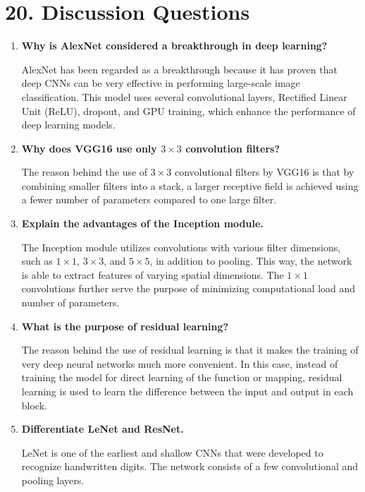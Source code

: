 \documentclass[11pt]{article}
\begin{document}
\section*{20. Discussion Questions}

\begin{enumerate}

\item \textbf{Why is AlexNet considered a breakthrough in deep learning?}

AlexNet has been regarded as a breakthrough because it has proven that deep CNNs can be very effective in performing large-scale image classification. This model uses several convolutional layers, Rectified Linear Unit (ReLU), dropout, and GPU training, which enhance the performance of deep learning models.

\item \textbf{Why does VGG16 use only $3\times3$ convolution filters?}

The reason behind the use of $3 \times 3$ convolutional filters by VGG16 is that by combining smaller filters into a stack, a larger receptive field is achieved using a fewer number of parameters compared to one large filter.

\item \textbf{Explain the advantages of the Inception module.}

The Inception module utilizes convolutions with various filter dimensions, such as $1\times1$, $3\times3$, and $5\times5$, in addition to pooling. This way, the network is able to extract features of varying spatial dimensions. The $1\times1$ convolutions further serve the purpose of minimizing computational load and number of parameters.

\item \textbf{What is the purpose of residual learning?}

The reason behind the use of residual learning is that it makes the training of very deep neural networks much more convenient. In this case, instead of training the model for direct learning of the function or mapping, residual learning is used to learn the difference between the input and output in each block.

\item \textbf{Differentiate LeNet and ResNet.}

LeNet is one of the earliest and shallow CNNs that were developed to recognize handwritten digits. The network consists of a few convolutional and pooling layers.


\end{enumerate}
\end{document}
